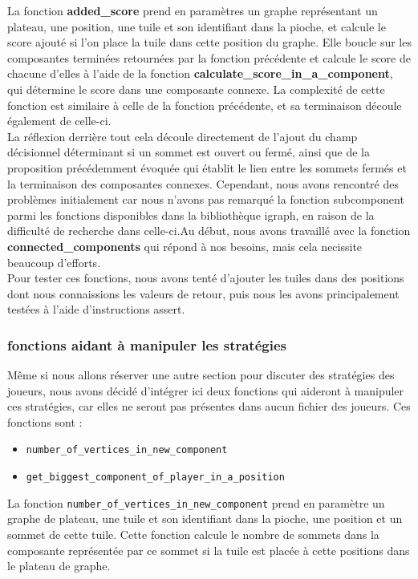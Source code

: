 La fonction \textbf{added\_score} prend en paramètres un graphe représentant un plateau, une position, une tuile et son identifiant dans la pioche, et calcule le score ajouté si l'on place la tuile dans cette position du graphe. Elle boucle sur les composantes terminées retournées par la fonction précédente et calcule le score de chacune d'elles à l'aide de la fonction \textbf{calculate\_score\_in\_a\_component}, qui détermine le score dans une composante connexe. La complexité de cette fonction est similaire à celle de la fonction précédente, et sa terminaison découle également de celle-ci.\\
La réflexion derrière tout cela découle directement de l'ajout du champ décisionnel déterminant si un sommet est ouvert ou fermé, ainsi que de la proposition précédemment évoquée qui établit le lien entre les sommets fermés et la terminaison des composantes connexes. Cependant, nous avons rencontré des problèmes initialement car nous n'avons pas remarqué la fonction subcomponent parmi les fonctions disponibles dans la bibliothèque igraph, en raison de la difficulté de recherche dans celle-ci.Au début, nous avons travaillé avec la fonction \textbf{connected\_components} qui répond à nos besoins, mais cela necissite beaucoup d'efforts.\\

Pour tester ces fonctions, nous avons tenté d'ajouter les tuiles dans des positions dont nous connaissions les valeurs de retour, puis nous les avons principalement testées à l'aide d'instructions assert.
\\

\subsubsection{fonctions aidant à manipuler les stratégies}
Même si nous allons réserver une autre section pour discuter des stratégies des joueurs, nous avons décidé d'intégrer ici deux fonctions qui aideront à manipuler ces stratégies, car elles ne seront pas présentes dans aucun fichier des joueurs. Ces fonctions sont :
\begin{itemize}
    \item \texttt{number\_of\_vertices\_in\_new\_component}
    \item \texttt{get\_biggest\_component\_of\_player\_in\_a\_position}
\end{itemize}
La fonction \texttt{number\_of\_vertices\_in\_new\_component} prend en paramètre un graphe de plateau, une tuile et son identifiant dans la pioche, une position et un sommet de cette tuile. Cette fonction calcule le nombre de sommets dans la composante représentée par ce sommet si la tuile est placée à cette positions dans le plateau de graphe.\\


